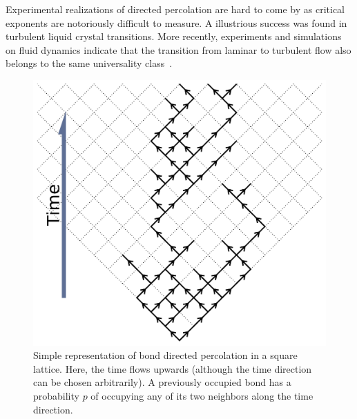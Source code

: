 Experimental realizations of directed percolation are hard to come by as
critical exponents are notoriously difficult to measure. A illustrious success
was found in turbulent liquid crystal transitions. More recently, experiments
and simulations on fluid dynamics indicate that the transition from laminar to
turbulent flow also belongs to the same universality class~\cite{Lemoult2016}.

\begin{figure}
\begin{center}
    \includegraphics[scale=0.5]{chapters/ch5-anis/figs/dperco_scheme}
\end{center}
\caption{Simple representation of bond directed percolation in a square
    lattice. Here, the time flows upwards (although the time direction can be
    chosen arbitrarily). A previously occupied bond has a probability $p$ of
    occupying any of its two neighbors along the time direction.}
\label{fig:dperco_scheme}
\end{figure}


